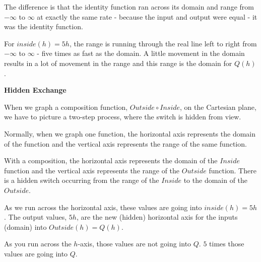 \documentclass{ximera}
\begin{document}
The difference is that the identity function ran across its domain and range from $-\infty$ to $\infty$ at exactly the same rate - because the input and output were equal - it was the identity function.


For $inside(h) = 5h$, the range is running through the real line left to right from $-\infty$ to $\infty$ - five times as fast as the domain. A little movement in the domain results in a lot of movement in the range and this range is the domain for $Q(h)$.






\begin{observation} \textbf{\textcolor{-red!75}{Hidden Exchange}}

When we graph a composition function, $Outside \circ Inside$, on the Cartesian plane, we have to picture a two-step process, where the switch is hidden from view.  

Normally, when we graph one function, the horizontal axis represents the domain of the function and the vertical axis represents the range of the same function.

With a composition, the horizontal axis represents the domain of the $Inside$ function and the vertical axis represents the range of the $Outside$ function.  There is a hidden switch occurring from the range of the $Inside$ to the domain of the $Outside$.

\end{observation}

As we run across the horizontal axis, these values are going into $inside(h) = 5h$.  The output values, $5h$, are the new (hidden) horizontal axis for the inputs (domain) into $Outside(h) = Q(h)$.

As you run across the $h$-axis, those values are not going into $Q$.  $5$ times those values are going into $Q$.
\end{document}

